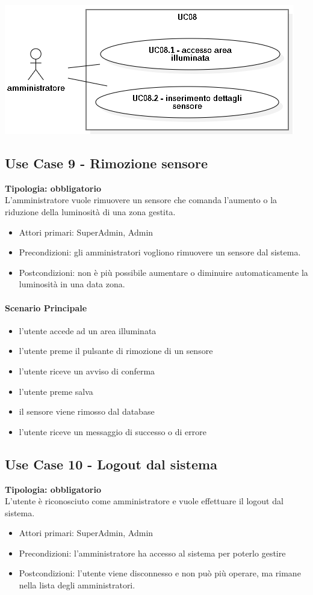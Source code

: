 \documentclass[12pt]{article}
\begin{document}
\includegraphics[scale=0.5]{UC08.png}

\subsection{Use Case 9 - Rimozione sensore}
\textbf{Tipologia: obbligatorio}\\
L'amministratore vuole rimuovere un sensore che comanda l'aumento o la riduzione della luminosità di una zona gestita.
\begin{itemize}
	\item Attori primari: SuperAdmin, Admin
	\item Precondizioni: gli amministratori vogliono rimuovere un sensore dal sistema.
	\item Postcondizioni: non è più possibile aumentare o diminuire automaticamente la luminosità in una data zona.
\end{itemize}
\paragraph{Scenario Principale}
\begin{itemize}
	\item l'utente accede ad un area illuminata
	\item l'utente preme il pulsante di rimozione di un sensore
	\item l'utente riceve un avviso di conferma
	\item l'utente preme salva
	\item il sensore viene rimosso dal database
	\item l'utente riceve un messaggio di successo o di errore
\end{itemize}


\subsection{Use Case 10 - Logout dal sistema}
\textbf{Tipologia: obbligatorio} \\
L'utente è riconosciuto come amministratore e vuole effettuare il logout dal sistema.
\begin{itemize}
	\item Attori primari: SuperAdmin, Admin
	\item Precondizioni: l'amministratore ha accesso al sistema per poterlo gestire
	\item Postcondizioni: l'utente viene disconnesso e non può più operare, ma rimane nella lista degli amministratori.
\end{itemize}
\end{document}
